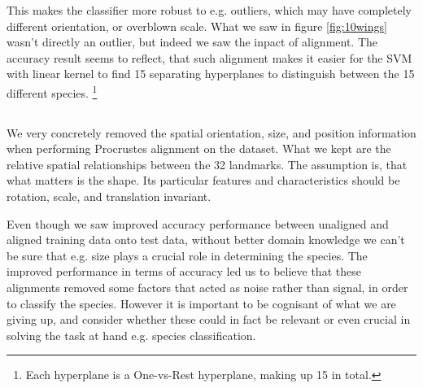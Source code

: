 This makes the classifier more robust to e.g. outliers, which may have completely different orientation,
or overblown scale. What we saw in figure \ref{fig:10wings} wasn't directly an outlier,
but indeed we saw the inpact of alignment. The accuracy result seems to reflect, that such alignment
makes it easier for the SVM with linear kernel to find 15 separating hyperplanes to distinguish between the 15 different species.
\footnote{Each hyperplane is a One-vs-Rest hyperplane, making up 15 in total.}

\subsection{} %

We very concretely removed the spatial orientation, size, and position information when performing Procrustes alignment on the dataset.
What we kept are the relative spatial relationships between the 32 landmarks.
The assumption is, that what matters is the shape. Its particular features and characteristics should be rotation, scale, and translation invariant.

Even though we saw improved accuracy performance between unaligned and aligned training data onto test data,
without better domain knowledge we can't be sure that e.g. size plays a crucial role in determining the species.
The improved performance in terms of accuracy led us to believe that these alignments removed
some factors that acted as noise rather than signal, in order to classify the species.
However it is important to be cognisant of what we are giving up, and consider whether these
could in fact be relevant or even crucial in solving the task at hand e.g. species classification.
